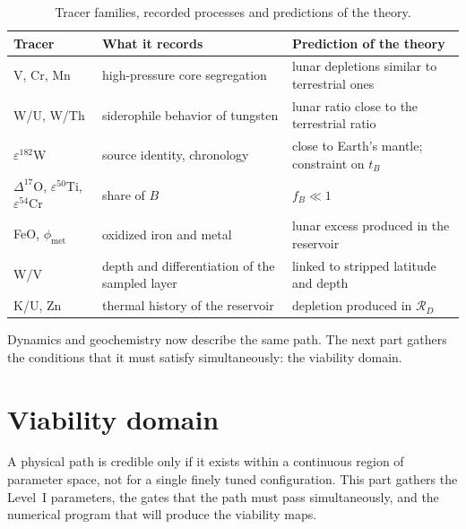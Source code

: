 \documentclass[11pt,a4paper,openany]{report}
\newcommand{\RD}{\mathcal{R}_{D}}
\begin{document}
\begin{table}[htbp]
\centering
\small
\caption{Tracer families, recorded processes and predictions of the theory.}
\label{tab:traceurs}
\begin{tabularx}{\textwidth}{>{\raggedright\arraybackslash}p{2.6cm}
>{\raggedright\arraybackslash}X >{\raggedright\arraybackslash}X}
\toprule
\textbf{Tracer} & \textbf{What it records} & \textbf{Prediction of the theory} \\
\midrule
V, Cr, Mn & high-pressure core segregation & lunar depletions similar to terrestrial ones \\
W/U, W/Th & siderophile behavior of tungsten & lunar ratio close to the terrestrial ratio \\
$\varepsilon^{182}$W & source identity, chronology & close to Earth's mantle; constraint on $t_B$ \\
$\Delta^{17}$O, $\varepsilon^{50}$Ti, $\varepsilon^{54}$Cr & share of $B$ & $f_B\ll1$ \\
FeO, $\phi_{\mathrm{met}}$ & oxidized iron and metal & lunar excess produced in the reservoir \\
W/V & depth and differentiation of the sampled layer & linked to stripped latitude and depth \\
K/U, Zn & thermal history of the reservoir & depletion produced in $\RD$ \\
\bottomrule
\end{tabularx}
\end{table}

\begin{rappel}
Dynamics and geochemistry now describe the same path. The next part gathers the conditions that it
must satisfy simultaneously: the viability domain.
\end{rappel}

\part{Viability domain}
\label{part:viabilite}

\noindent
A physical path is credible only if it exists within a continuous region of parameter space, not
for a single finely tuned configuration. This part gathers the Level~I parameters, the gates that
the path must pass simultaneously, and the numerical program that will produce the viability maps.
\end{document}
